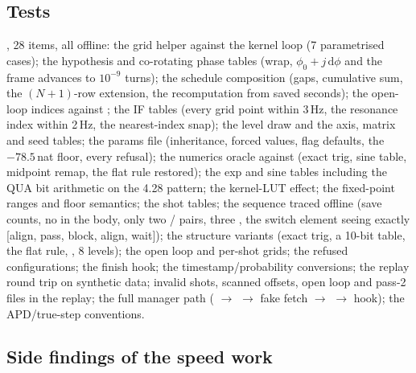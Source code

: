 \subsection{Tests}

, 28 items, all offline: the grid
helper against the kernel loop (7 parametrised cases); the hypothesis and
co-rotating phase tables (wrap, $\phi_{0} + j\,\mathrm{d}\phi$ and the frame
advances to $10^{-9}$ turns); the schedule composition (gaps, cumulative sum,
the $(N{+}1)$-row extension, the recomputation from saved seconds); the
open-loop indices against ; the IF tables
(every grid point within 3\,Hz, the resonance index within 2\,Hz, the
nearest-index snap); the level draw and the axis, matrix and seed tables; the
params file (inheritance, forced values, flag defaults, the $-78.5$\,nat floor,
every refusal); the numerics oracle against  (exact
trig, sine table, midpoint remap, the flat rule restored); the exp and sine
tables including the QUA bit arithmetic on the 4.28 pattern; the kernel-LUT
effect; the fixed-point ranges and floor semantics; the shot tables; the
sequence traced offline (save counts, no  in the body, only two
/ pairs, three , the switch element
seeing exactly [align, pass, block, align, wait]); the structure variants
(exact trig, a 10-bit table, the flat rule, , 8 levels); the
open loop and per-shot grids; the refused configurations; the finish hook; the
timestamp/probability conversions; the replay round trip on synthetic data;
invalid shots, scanned offsets, open loop and pass-2 files in the replay; the
full manager path ( $\to$  $\to$ fake fetch
$\to$  $\to$ hook); the APD/true-step conventions.

\subsection{Side findings of the speed work}
\label{sec:feedback:side}

